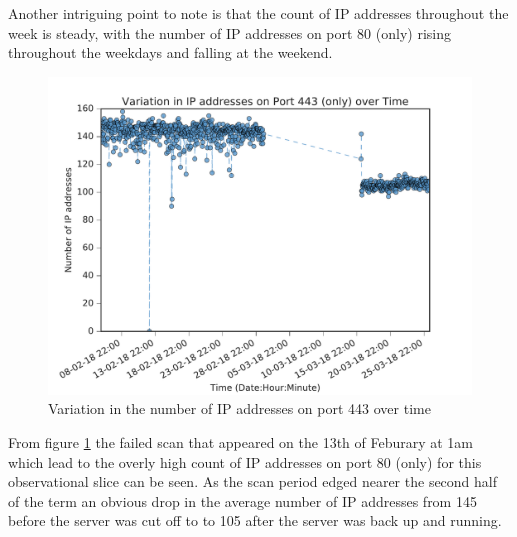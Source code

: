 \documentclass[a4wide,leqno,12pt]{report}
\begin{document}
Another intriguing  point to note is that the count of IP addresses throughout the week is steady, with the number of IP addresses on port 80 (only) rising throughout the weekdays and falling at the weekend.

\begin{figure}[H]
\centering
\includegraphics[scale=.5]{pdf_images/Ip_p443_alpha}
\caption{Variation in the number of IP addresses on port 443 over time}
\label{fig:port443ZMap}
\end{figure}


From figure \ref{fig:port443ZMap} the failed scan that appeared on the 13th of Feburary at 1am which lead to the overly high count of IP addresses on port 80 (only) for this observational slice can be seen. As the scan period edged nearer the second half of the term an obvious drop in the average number of IP addresses from 145 before the server was cut off to to 105 after the server was back up and running.
\end{document}
